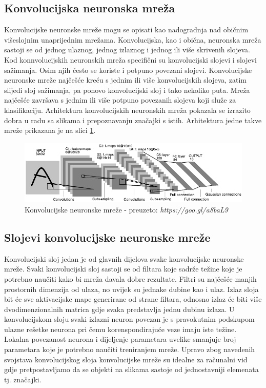 \documentclass[times, utf8, zavrsni, numeric]{fer}
\begin{document}
\subsection{Konvolucijska neuronska mreža}

Konvolucijske neuronske mreže mogu se opisati kao nadogradnja nad običnim višeslojnim unaprijednim mrežama. Konvolucijska, kao i obična, neuronska mreža sastoji se od jednog ulaznog, jednog izlaznog i jednog ili više skrivenih slojeva. Kod konnvolucijskih neuronskih mreža specifični su konvolucijski slojevi i slojevi sažimanja. Osim njih često se koriste i potpuno povezani slojevi. Konvolucijske neuronske mreže najčešće kreću s jednim ili više konvolucijskih slojeva, zatim slijedi sloj sažimanja, pa ponovo konvolucijski sloj i tako nekoliko puta. Mreža najčešće završava s jednim ili više potpuno povezanih slojeva koji služe za klasifikaciju. Arhitektura konvolucijskih neuronskih mreža pokazala se izrazito dobra u radu sa slikama i prepoznavanju značajki s istih. Arhitektura jedne takve mreže prikazana je na slici \ref{fig:conv}.

\begin{figure}[htb]
    \centering
    \includegraphics[width=13cm]{images/conv.png}
    \caption{Konvolucijske neuronske mreže - preuzeto: \emph{https://goo.gl/a8baL9}}
    \label{fig:conv}
\end{figure}

\subsection{Slojevi konvolucijske neuronske mreže}

Konvolucijski sloj jedan je od glavnih dijelova svake konvolucijske neuronske mreže. Svaki konvolucijski sloj sastoji se od filtara koje sadrže težine koje je potrebno naučiti kako bi mreža davala dobre rezultate. Filtri su najčešće manjih prostornih dimenzija od ulaza, no uvijek su jednake dubine kao i ulaz. Izlaz sloja bit će sve aktivacijske mape generirane od strane filtara, odnosno izlaz će biti više dvodimenzionalnih matrica gdje svaka predstavlja jednu dubinu izlaza. U konvolucijskom sloju svaki izlazni neuron povezan je s pravokutnim podskupom ulazne rešetke neurona pri čemu korenspondirajuće veze imaju iste težine. Lokalna povezanost neurona i dijeljenje parametara uvelike smanjuje broj parametara koje je potrebno naučiti treniranjem mreže. Upravo zbog navedenih svojstava konvolucijskog sloja konvolucijske mreže su idealne za računalni vid gdje pretpostavljamo da se objekti na slikama sastoje od jednostavniji elemenata tj. značajki.
\end{document}
